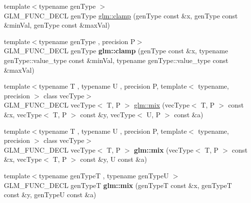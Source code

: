 \begin{DoxyCompactItemize}
\item 
{\footnotesize template$<$typename gen\+Type $>$ }\\G\+L\+M\+\_\+\+F\+U\+N\+C\+\_\+\+D\+E\+CL gen\+Type \hyperlink{group__core__func__common_ga72e9e213c84f06a329a2a838b51200f4}{glm\+::clamp} (gen\+Type const \&x, gen\+Type const \&min\+Val, gen\+Type const \&max\+Val)
\item 
{\footnotesize template$<$typename gen\+Type , precision P$>$ }\\G\+L\+M\+\_\+\+F\+U\+N\+C\+\_\+\+D\+E\+CL gen\+Type {\bfseries glm\+::clamp} (gen\+Type const \&x, typename gen\+Type\+::value\+\_\+type const \&min\+Val, typename gen\+Type\+::value\+\_\+type const \&max\+Val)\hypertarget{group__core__func__common_ga5409c55a5f3aaae3e02ed440a47380bb}{}\label{group__core__func__common_ga5409c55a5f3aaae3e02ed440a47380bb}

\item 
{\footnotesize template$<$typename T , typename U , precision P, template$<$ typename, precision $>$ class vec\+Type$>$ }\\G\+L\+M\+\_\+\+F\+U\+N\+C\+\_\+\+D\+E\+CL vec\+Type$<$ T, P $>$ \hyperlink{group__core__func__common_gadccbaffe46f369cf1a96b2aef92cbfdd}{glm\+::mix} (vec\+Type$<$ T, P $>$ const \&x, vec\+Type$<$ T, P $>$ const \&y, vec\+Type$<$ U, P $>$ const \&a)
\item 
{\footnotesize template$<$typename T , typename U , precision P, template$<$ typename, precision $>$ class vec\+Type$>$ }\\G\+L\+M\+\_\+\+F\+U\+N\+C\+\_\+\+D\+E\+CL vec\+Type$<$ T, P $>$ {\bfseries glm\+::mix} (vec\+Type$<$ T, P $>$ const \&x, vec\+Type$<$ T, P $>$ const \&y, U const \&a)\hypertarget{group__core__func__common_gaa5c83ada94113757c0a555ab4f40cd6e}{}\label{group__core__func__common_gaa5c83ada94113757c0a555ab4f40cd6e}

\item 
{\footnotesize template$<$typename gen\+TypeT , typename gen\+TypeU $>$ }\\G\+L\+M\+\_\+\+F\+U\+N\+C\+\_\+\+D\+E\+CL gen\+TypeT {\bfseries glm\+::mix} (gen\+TypeT const \&x, gen\+TypeT const \&y, gen\+TypeU const \&a)\hypertarget{group__core__func__common_ga78aae7eea618ca112053d59fe03db239}{}\label{group__core__func__common_ga78aae7eea618ca112053d59fe03db239}


\end{DoxyCompactItemize}
